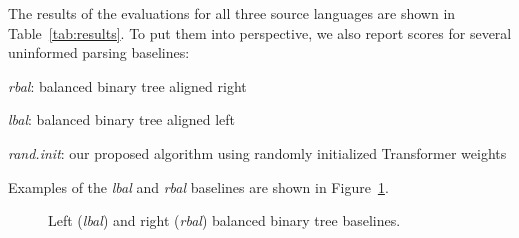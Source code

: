 \documentclass[11pt,a4paper]{article}
\def\RR#1{{\color{blue}RR: \it #1}}
\def\DM#1{{\color{red}DM: \it #1}}
\def\RR#1{}
\def\DM#1{}
\begin{document}
The results of the evaluations for all three source languages are shown in Table~\ref{tab:results}.
To put them into perspective, we also report scores for several uninformed parsing baselines:
\begin{compactenum}
\item \emph{rbal}: balanced binary tree aligned right
\item \emph{lbal}: balanced binary tree aligned left
\item \emph{rand.init}: our proposed algorithm using randomly initialized Transformer weights
\end{compactenum}
Examples of the \emph{lbal} and \emph{rbal} baselines are shown in Figure~\ref{fig:baselines}.

\begin{figure}[t]
\begin{center}
\end{center}
\caption{Left (\emph{lbal}) and right (\emph{rbal}) balanced binary tree baselines.}
\label{fig:baselines}
\end{figure}



\end{document}
